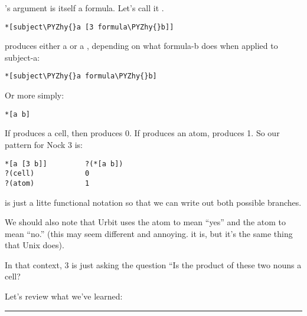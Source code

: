's argument is itself a formula. Let's call it .
\begin{framed_shaded}
\begin{Verbatim}[fontsize=\relsize{-2.5},fontseries=b,commandchars=\\\{\}]
*[subject\PYZhy{}a [3 formula\PYZhy{}b]]
\end{Verbatim}
\end{framed_shaded}
 produces either a  or a , depending on what formula-b does when
applied to subject-a:
\begin{framed_shaded}
\begin{Verbatim}[fontsize=\relsize{-2.5},fontseries=b,commandchars=\\\{\}]
*[subject\PYZhy{}a formula\PYZhy{}b]
\end{Verbatim}
\end{framed_shaded}
Or more simply:
\begin{framed_shaded}
\begin{Verbatim}[fontsize=\relsize{-2.5},fontseries=b,commandchars=\\\{\}]
*[a b]
\end{Verbatim}
\end{framed_shaded}
If \kode{*[a b]} produces a cell, then \kode{*[a [3 b]]} produces 0. If \kode{*[a b]} produces
an atom, \kode{*[a [3 b]]} produces 1. So our pattern for Nock 3 is:
\begin{framed_shaded}
\begin{Verbatim}[fontsize=\relsize{-2.5},fontseries=b,commandchars=\\\{\}]
*[a [3 b]]         ?(*[a b])
?(cell)            0
?(atom)            1
\end{Verbatim}
\end{framed_shaded}
 is just a litte functional notation so that we can write out both possible branches.

We should also note that Urbit uses the atom  to mean ``yes'' and the atom 
to mean ``no.'' (this may seem different and annoying. it is, but it's
the same thing that Unix does).

In that context, 3 is just asking the question ``Is the product of these two nouns a cell?

Let's review what we've learned:

\begin{center}
\rule{3in}{0.4pt}
\end{center}

